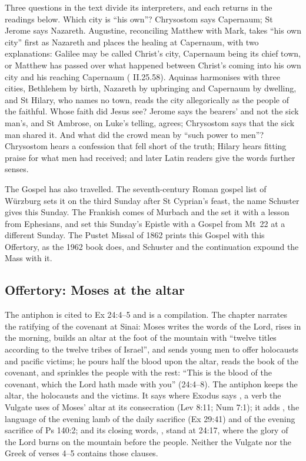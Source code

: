 Three questions in the text divide its interpreters, and each returns in the
readings below. Which city is ``his own''? Chrysostom says Capernaum; St Jerome
says Nazareth. Augustine, reconciling Matthew with Mark, takes ``his own city''
first as Nazareth and places the healing at Capernaum, with two explanations:
Galilee may be called Christ's city, Capernaum being its chief town, or Matthew
has passed over what happened between Christ's coming into his own city and his
reaching Capernaum ( II.25.58). Aquinas
harmonises with three cities, Bethlehem by birth, Nazareth by upbringing and
Capernaum by dwelling, and St Hilary, who names no town, reads the city
allegorically as the people of the faithful. Whose faith did Jesus see? Jerome
says the bearers' and not the sick man's, and St Ambrose, on Luke's telling,
agrees; Chrysostom says that the sick man shared it. And what did the crowd mean by ``such
power to men''? Chrysostom hears a confession that fell short of the truth;
Hilary hears fitting praise for what men had received; and later Latin readers
give the words further senses.

The Gospel has also travelled. The seventh-century Roman gospel list of
Würzburg sets it on the third Sunday after St Cyprian's feast, the name
Schuster gives this Sunday. The Frankish comes of Murbach and the
 set it with a lesson from Ephesians, and set this Sunday's
Epistle with a Gospel from Mt~22 at a different Sunday. The Pustet Missal of
1862 prints this Gospel with this Offertory, as the 1962 book does, and Schuster and the continuation expound the Mass with it.

\subsection{Offertory: Moses at the altar}

The antiphon is cited to Ex 24:4--5 and is a compilation. The chapter narrates
the ratifying of the covenant at Sinai: Moses writes the words of the Lord,
rises in the morning, builds an altar at the foot of the mountain with
``twelve titles according to the twelve tribes of Israel'', and sends young
men to offer holocausts and pacific victims; he pours half the blood upon the
altar, reads the book of the covenant, and sprinkles the people with the rest: ``This is the blood of
the covenant, which the Lord hath made with you'' (24:4--8). The antiphon keeps
the altar, the holocausts and the victims. It says  where
Exodus says , a verb the Vulgate uses of Moses' altar at its
consecration (Lev 8:11; Num 7:1); it adds , the language of the evening lamb of the daily sacrifice
(Ex 29:41) and of the evening sacrifice of Ps 140:2; and its closing words,
, stand at 24:17, where the glory of the
Lord burns on the mountain before the people. Neither the Vulgate nor the Greek
of verses 4--5 contains those clauses.


